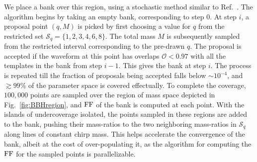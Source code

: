 We place a bank over this region, using a stochastic method similar 
to Ref.~\citep{Harry:2009ea,Ajith:2012mn,Manca:2009xw}. 
The algorithm begins by taking an empty bank,
corresponding to step $0$. At step $i$, a proposal point $(q,M)$ is picked
by first choosing a value for $q$ from the restricted set
$\mathcal{S}_q=\{1,2,3,4,6,8\}$. The total mass $M$ is subsequently sampled
from the restricted interval corresponding to the pre-drawn $q$. The proposal 
is accepted if the waveform at this point has overlaps $\mathcal{O}< 0.97$ 
with all the templates in the bank from step $i-1$. This gives 
the bank at step $i$. The process is repeated till the fraction of 
proposals being accepted falls below $\sim 10^{-4}$, and $\gtrsim 99\%$
of the parameter space is covered effectually.
To complete the coverage, $100,000$ points are sampled over the region of mass
space depicted in Fig.~\ref{fig:BBHregion}, and $\mathrm{FF}$ of the bank
is computed at each point. With the islands of undercoverage isolated, the
points sampled in these regions are added to the bank, pushing their 
mass-ratios to the two neighboring mass-ratios in $\mathcal{S}_q$ 
along lines of constant chirp mass. 
This helps accelerate the convergence of the bank, albeit at the cost of 
over-populating it, as the algorithm for computing the $\mathrm{FF}$ for the 
sampled points is parallelizable.

